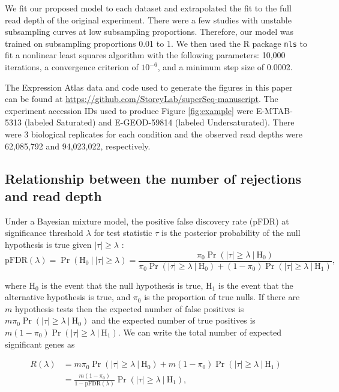 \documentclass[11pt]{article}
\begin{document}
We fit our proposed model to each dataset and extrapolated the fit to the full read depth of the original experiment. There were a few studies with unstable subsampling curves at low subsampling proportions. Therefore, our model was trained on subsampling proportions 0.01 to 1. We then used the R package \texttt{nls} to fit a nonlinear least squares algorithm with the following parameters: 10,000 iterations, a convergence criterion of $10^{-6}$, and a minimum step size of 0.0002.

The Expression Atlas data and code used to generate the figures in this paper can be found at \url{https://github.com/StoreyLab/superSeq-manuscript}. The experiment accession IDs used to produce Figure \ref{fig:example} were E-MTAB-5313 (labeled Saturated) and E-GEOD-59814 (labeled Undersaturated). There were 3 biological replicates for each condition and the observed read depths were 62,085,792 and 94,023,022, respectively.

\subsection{Relationship between the number of rejections and read depth\label{Subsec:methods}}

Under a Bayesian mixture model, the positive false discovery rate (pFDR) at significance threshold $\lambda$ for test statistic $\tau$ is the posterior probability of the null hypothesis is true given $|\tau| \geq \lambda$ \cite{Storey:2002,Storey:2003_pFDR,Storey:2003_PNAS}:
$$
\text{pFDR}(\lambda) = \Pr\left(\text{H}_{0}  \:\big\vert\: |\tau| \geq \lambda \right) = \dfrac{\pi_{0}\Pr\left(|\tau| \geq \lambda \:\big\vert\: \text{H}_{0}\right)}{\pi_{0}\Pr\left(|\tau| \geq \lambda \:\big\vert\: \text{H}_{0}\right) + (1-\pi_{0})\Pr\left(|\tau| \geq \lambda\:\big\vert\: \text{H}_{1}\right)},
$$

\noindent where $\text{H}_{0}$ is the event that the null hypothesis is true, $\text{H}_{1}$ is the event that the alternative hypothesis is true, and $\pi_{0}$ is the proportion of true nulls. If there are $m$ hypothesis tests then the expected number of false positives is $m\pi_{0}\Pr\left(|\tau| \geq \lambda \:\big\vert\: \text{H}_{0}\right)$ and the expected number of true positives is $m(1-\pi_{0})\Pr\left(|\tau| \geq \lambda\:\big\vert\: \text{H}_{1}\right)$. We can write the total number of expected significant genes as 

$$
\begin{aligned}
R(\lambda)&= m\pi_{0}\Pr\left(|\tau| \geq \lambda \:\big\vert\: \text{H}_{0}\right) + m(1-\pi_{0})\Pr\left(|\tau| \geq \lambda\:\big\vert\: \text{H}_{1}\right)\\
&=  \frac{m(1-\pi_{0})}{1-\text{pFDR}(\lambda)}\Pr\left(|\tau| \geq \lambda\:\big\vert\: \text{H}_{1}\right),
\end{aligned}
$$
\end{document}
